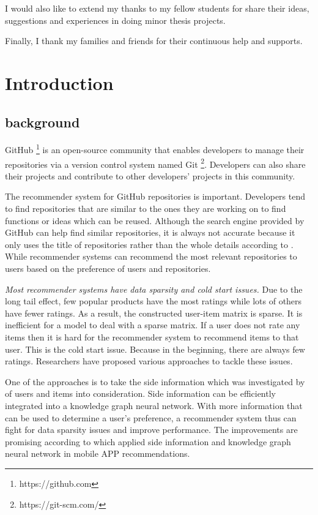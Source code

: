 \documentclass[11pt,twoside]{report}
\begin{document}
I would also like to extend my thanks to my fellow students for share their ideas, suggestions and experiences in doing minor thesis projects.

Finally, I thank my families and friends for their continuous help and supports.

{
    \hypersetup{linkcolor=black}
    \tableofcontents
    \listoffigures
    \listoftables
}


\chapter{Introduction}
\section{background}
GitHub \footnote{https://github.com} is an open-source community that enables developers to manage their repositories via a version control system named Git \footnote{https://git-scm.com/}. Developers can also share their projects and contribute to other developers’ projects in this community.

The recommender system for GitHub repositories is important. Developers tend to find repositories that are similar to the ones they are working on to find functions or ideas which can be reused. Although the search engine provided by GitHub can help find similar repositories, it is always not accurate because it only uses the title of repositories rather than the whole details according to \cite{xu_repersp_2017}. While recommender systems can recommend the most relevant repositories to users based on the preference of users and repositories.

\textit{Most recommender systems have data sparsity and cold start issues.} Due to the long tail effect, few popular products have the most ratings while lots of others have fewer ratings. As a result, the constructed user-item matrix is sparse. It is inefficient for a model to deal with a sparse matrix. If a user does not rate any items then it is hard for the recommender system to recommend items to that user. This is the cold start issue. Because in the beginning, there are always few ratings. Researchers have proposed various approaches to tackle these issues.

One of the approaches is to take the side information which was investigated by \cite{jonschkowski_patterns_2016} of users and items into consideration. Side information can be efficiently integrated into a knowledge graph neural network. With more information that can be used to determine a user's preference, a recommender system thus can fight for data sparsity issues and improve performance. The improvements are promising according to \cite{zhang_knowledge_2020} which applied side information and knowledge graph neural network in mobile APP recommendations.
\end{document}
